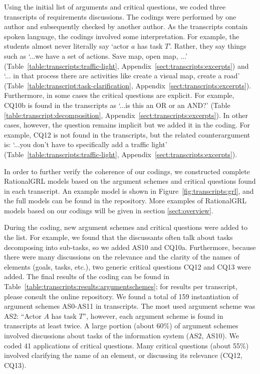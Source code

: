 Using the initial list of arguments and critical questions, we coded three transcripts of requirements discussions. The codings were performed by one author and subsequently checked by another author. As the transcripts contain spoken language, the codings involved some interpretation. For example, the students almost never literally say `actor $a$ has task $T$'. Rather, they say things such as `...we have a set of actions. Save map, open map, ...' (Table~\ref{table:transcripts:traffic-light}, Appendix~\ref{sect:transcripts:excerpts}) and `... in that process there are activities like create a visual map, create a road' (Table~\ref{table:transcript:task-clarification}, Appendix~\ref{sect:transcripts:excerpts}). Furthermore, in some cases the critical questions are explicit. For example, CQ10b is found in the transcripts as `...is this an OR or an AND?' (Table \ref{table:transcript:decomposition}, Appendix~\ref{sect:transcripts:excerpts}). In other cases, however, the question remains implicit but we added it in the coding. For example, CQ12 is not found in the transcripts, but the related counterargument is:  `...you don't have to specifically add a traffic light' (Table~\ref{table:transcripts:traffic-light}, Appendix~\ref{sect:transcripts:excerpts}). 

In order to further verify the coherence of our codings, we constructed complete RationalGRL models based on the argument schemes and critical questions found in each transcript. An example model is shown in Figure~\ref{fig:transcripts:grl}, and the full models can be found in the repository. More examples of RationalGRL models based on our codings will be given in section \ref{sect:overview}.

During the coding, new argument schemes and critical questions were added to the list. For example, we found that the discussants often talk about tasks decomposing into sub-tasks, so we added AS10 and CQ10a. Furthermore, because there were many discussions on the relevance and the clarity of the names of elements (goals, tasks, etc.), two generic critical questions CQ12 and CQ13 were added. The final results of the coding can be found in Table~\ref{table:transcripts:results:argumentschemes}; for results per transcript, please consult the online repository. We found a total of 159 instantiation of argument schemes AS0-AS11 in transcripts. The most used argument scheme was AS2: ``Actor $A$ has task $T$'', however, each argument scheme is found in transcripts at least twice. A large portion (about 60\%) of argument schemes involved discussions about tasks of the information system (AS2, AS10). We coded 41 applications of critical questions. Many critical questions (about 55\%) involved clarifying the name of an element, or discussing its relevance (CQ12, CQ13).

